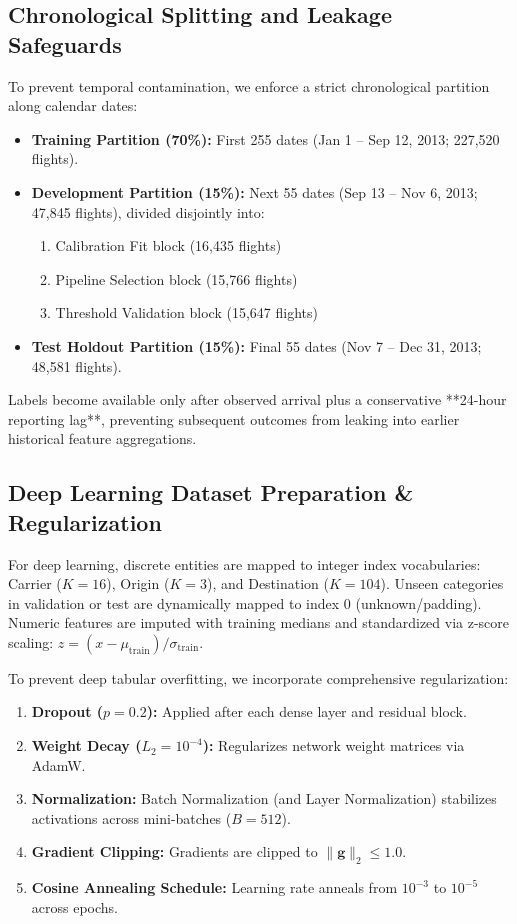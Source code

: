 \documentclass[conference]{IEEEtran}
\begin{document}
\subsection{Chronological Splitting and Leakage Safeguards}
To prevent temporal contamination, we enforce a strict chronological partition along calendar dates:
\begin{itemize}
    \item \textbf{Training Partition (70\%):} First 255 dates (Jan 1 -- Sep 12, 2013; 227,520 flights).
    \item \textbf{Development Partition (15\%):} Next 55 dates (Sep 13 -- Nov 6, 2013; 47,845 flights), divided disjointly into:
    \begin{enumerate}
        \item Calibration Fit block (16,435 flights)
        \item Pipeline Selection block (15,766 flights)
        \item Threshold Validation block (15,647 flights)
    \end{enumerate}
    \item \textbf{Test Holdout Partition (15\%):} Final 55 dates (Nov 7 -- Dec 31, 2013; 48,581 flights).
\end{itemize}

Labels become available only after observed arrival plus a conservative **24-hour reporting lag**, preventing subsequent outcomes from leaking into earlier historical feature aggregations.

\subsection{Deep Learning Dataset Preparation \& Regularization}
For deep learning, discrete entities are mapped to integer index vocabularies: Carrier ($K=16$), Origin ($K=3$), and Destination ($K=104$). Unseen categories in validation or test are dynamically mapped to index 0 (unknown/padding). Numeric features are imputed with training medians and standardized via z-score scaling: $z = (x - \mu_{\text{train}}) / \sigma_{\text{train}}$.

To prevent deep tabular overfitting, we incorporate comprehensive regularization:
\begin{enumerate}
    \item \textbf{Dropout ($p=0.2$):} Applied after each dense layer and residual block.
    \item \textbf{Weight Decay ($L_2 = 10^{-4}$):} Regularizes network weight matrices via AdamW.
    \item \textbf{Normalization:} Batch Normalization (and Layer Normalization) stabilizes activations across mini-batches ($B=512$).
    \item \textbf{Gradient Clipping:} Gradients are clipped to $\|\mathbf{g}\|_2 \le 1.0$.
    \item \textbf{Cosine Annealing Schedule:} Learning rate anneals from $10^{-3}$ to $10^{-5}$ across epochs.
\end{enumerate}
\end{document}
